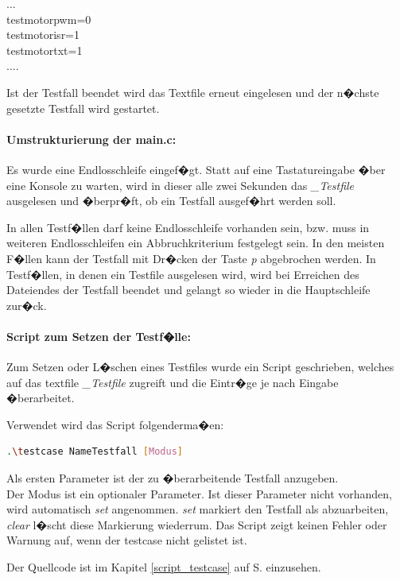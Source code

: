 ...\\
testmotorpwm=0\\
testmotorisr=1\\
testmotortxt=1\\
....

Ist der Testfall beendet wird das Textfile erneut eingelesen und der n�chste gesetzte Testfall wird gestartet.

\newpage
\paragraph{Umstrukturierung der main.c:}

Es wurde eine Endlosschleife eingef�gt. Statt auf eine Tastatureingabe �ber eine Konsole zu warten, wird in dieser alle zwei Sekunden das \textit{\_Testfile} ausgelesen und �berpr�ft, ob ein Testfall ausgef�hrt werden soll.

In allen Testf�llen darf keine Endlosschleife vorhanden sein, bzw. muss in weiteren Endlosschleifen ein Abbruchkriterium festgelegt sein. In den meisten F�llen kann der Testfall mit Dr�cken der Taste \textit{p} abgebrochen werden. In Testf�llen, in denen ein Testfile ausgelesen wird, wird bei Erreichen des Dateiendes der Testfall beendet und gelangt so wieder in die Hauptschleife zur�ck.

\paragraph{Script zum Setzen der Testf�lle:}

Zum Setzen oder L�schen eines Testfiles wurde ein Script geschrieben, welches auf das textfile \textit{\_Testfile} zugreift und die Eintr�ge je nach Eingabe �berarbeitet.

Verwendet wird das Script folgenderma�en:

\begin{lstlisting}[language=bash]
.\testcase NameTestfall [Modus]
\end{lstlisting}
 	 
Als ersten Parameter ist der zu �berarbeitende Testfall anzugeben.\\
Der Modus ist ein optionaler Parameter. Ist dieser Parameter nicht vorhanden, wird automatisch \emph{set} angenommen. \textit{set} markiert den Testfall als abzuarbeiten, \textit{clear} l�scht diese Markierung wiederrum. Das Script zeigt keinen Fehler oder Warnung auf, wenn der testcase nicht gelistet ist.

Der Quellcode ist im Kapitel \ref{script_testcase}  auf S.\pageref{script_testcase} einzusehen.



